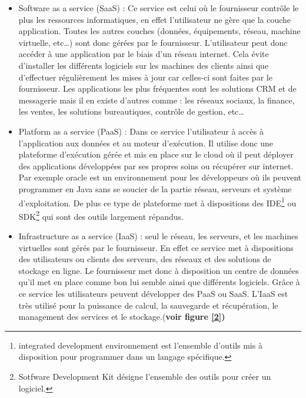\documentclass[a4 paper, 12 pt]{article}
\begin{document}
\begin{itemize}

\item Software as a service (SaaS) : Ce service est celui où le fournisseur contrôle le plus les ressources informatiques, en effet l’utilisateur ne gère que la couche application. Toutes les autres couches (données, équipements, réseau, machine virtuelle, etc…) sont donc gérées par le fournisseur. L’utilisateur peut donc accéder à une application par le biais d’un réseau internet. Cela évite d’installer les différents logiciels sur les machines des clients ainsi que d’effectuer régulièrement les mises à jour car celles-ci sont faites par le fournisseur. Les applications les plus fréquentes sont les solutions CRM et de messagerie mais il en existe d’autres comme :  les réseaux sociaux, la finance, les ventes, les solutions bureautiques, contrôle de gestion, etc… \newline

\item Platform as a service (PaaS) : Dans ce service l’utilisateur à accès à l’application aux données et au moteur d’exécution. Il utilise donc une plateforme d’exécution gérée et mis en place sur le cloud où il peut déployer des applications développées par ses propres soins ou récupérer sur internet. Par exemple oracle est un environnement pour les développeurs où ils peuvent programmer en Java sans se soucier de la partie réseau, serveurs et système d’exploitation. De plus ce type de plateforme met à dispositions des IDE\footnote{integrated development environnement est l'ensemble d'outils mis à disposition pour programmer dans un langage spécifique.} ou SDK\footnote{Sotfware Development Kit désigne l'ensemble des outils pour créer un logiciel.} qui sont des outils largement répandus. \newline

\item Infrastructure as a service (IaaS) : seul le réseau, les serveurs, et les machines virtuelles sont gérés par le fournisseur.\cite{leon:tel-01138912} En effet ce service met à dispositions des utilisateurs ou clients des serveurs, des réseaux et des solutions de stockage en ligne. Le fournisseur met donc à disposition un centre de données qu’il met en place comme bon lui semble ainsi que différents logiciels. Grâce à ce service les utilisateurs peuvent développer des PaaS ou SaaS. L’IaaS est très utilisé pour la puissance de calcul, la sauvegarde et récupération, le management des services et le stockage.(\textbf {voir figure \ref{2})} \newline

\end{itemize}
\end{document}

